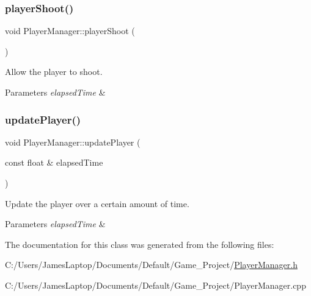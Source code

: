 \subsubsection{\texorpdfstring{player\+Shoot()}{playerShoot()}}
{\footnotesize\ttfamily void Player\+Manager\+::player\+Shoot (\begin{DoxyParamCaption}{ }\end{DoxyParamCaption})}



Allow the player to shoot. 


\begin{DoxyParams}{Parameters}
{\em elapsed\+Time} & \\
\hline
\end{DoxyParams}
\mbox{\label{class_player_manager_a171946405d72c219802315721e09467d}} 
\subsubsection{\texorpdfstring{update\+Player()}{updatePlayer()}}
{\footnotesize\ttfamily void Player\+Manager\+::update\+Player (\begin{DoxyParamCaption}\item[{const float \&}]{elapsed\+Time }\end{DoxyParamCaption})}



Update the player over a certain amount of time. 


\begin{DoxyParams}{Parameters}
{\em elapsed\+Time} & \\
\hline
\end{DoxyParams}


The documentation for this class was generated from the following files\+:\begin{DoxyCompactItemize}
\item 
C\+:/\+Users/\+James\+Laptop/\+Documents/\+Default/\+Game\+\_\+\+Project/\hyperlink{_player_manager_8h}{Player\+Manager.\+h}\item 
C\+:/\+Users/\+James\+Laptop/\+Documents/\+Default/\+Game\+\_\+\+Project/Player\+Manager.\+cpp\end{DoxyCompactItemize}
